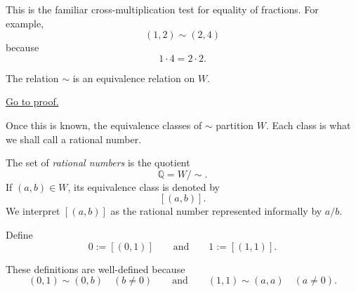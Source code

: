 \begin{remark*}
This is the familiar cross-multiplication test for equality of fractions.  For example,
\[
(1,2)\sim(2,4)
\]
because
\[
1\cdot 4 = 2\cdot 2.
\]
\end{remark*}

\begin{theorem}
\label{thm:fraction-pair-equivalence}
The relation $\sim$ is an equivalence relation on $W$.
\end{theorem}

\begin{remark*}[Proof]
\hyperref[prf:fraction-pair-equivalence]{Go to proof.}
\end{remark*}

\begin{remark*}
Once this is known, the equivalence classes of $\sim$ partition $W$.  Each class is what we shall
call a rational number.
\end{remark*}

\begin{definition}
\label{def:rational-numbers}

The set of \emph{rational numbers} is the quotient
\[
\mathbb{Q} = W/\sim.
\]
If $(a,b)\in W$, its equivalence class is denoted by
\[
[(a,b)].
\]
We interpret $[(a,b)]$ as the rational number represented informally by $a/b$.

\end{definition}

\begin{definition}
\label{def:rational-distinguished}

Define
\[
0 := [(0,1)]
\qquad\text{and}\qquad
1 := [(1,1)].
\]

\end{definition}

\begin{remark*}
These definitions are well-defined because
\[
(0,1)\sim(0,b) \quad (b\neq 0)
\qquad\text{and}\qquad
(1,1)\sim(a,a) \quad (a\neq 0).
\]
\end{remark*}
